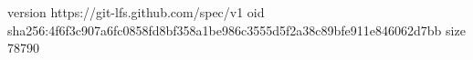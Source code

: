 version https://git-lfs.github.com/spec/v1
oid sha256:4f6f3c907a6fc0858fd8bf358a1be986c3555d5f2a38c89bfe911e846062d7bb
size 78790
